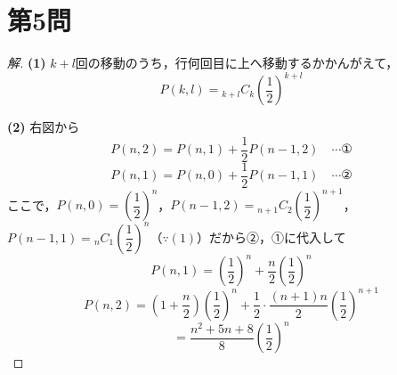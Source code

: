 \documentclass[../main.tex]{subfiles}
\begin{document}
\newpage

\section*{第5問}

\begin{proof}[解]
  \textbf{(1)} $k+l$回の移動のうち，行何回目に上へ移動するかかんがえて，
  \[
    P(k,l)={}_{k+l}C_k\left(\frac12\right)^{k+l}
  \]

  \textbf{(2)} 右図から
  \[
    P(n,2)=P(n,1)+\frac12P(n-1,2) \quad\cdots\text{①}
  \]
  \[
    P(n,1)=P(n,0)+\frac12P(n-1,1) \quad\cdots\text{②}
  \]
  ここで，$P(n,0)=\left(\dfrac12\right)^n$，$P(n-1,2)={}_{n+1}C_2\left(\dfrac12\right)^{n+1}$，$P(n-1,1)={}_nC_1\left(\dfrac12\right)^n$（$\because(1)$）だから②，①に代入して
  \[
    P(n,1)=\left(\frac12\right)^n+\frac{n}{2}\left(\frac12\right)^n
  \]
  \[
    P(n,2)=\left(1+\frac{n}{2}\right)\left(\frac12\right)^n+\frac12\cdot\frac{(n+1)n}{2}\left(\frac12\right)^{n+1}
  \]
  \[
    =\frac{n^2+5n+8}{8}\left(\frac12\right)^n
  \]
\end{proof}
\end{document}
